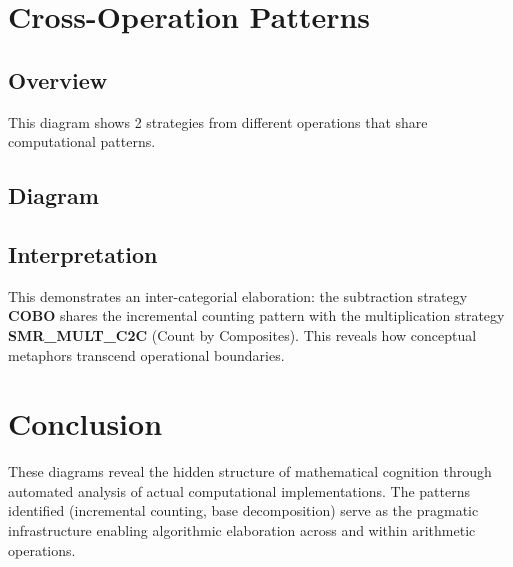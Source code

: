 \documentclass{article}
\begin{document}
\newpage

\section{Cross-Operation Patterns}

\subsection{Overview}
This diagram shows 2 strategies from different operations that share computational patterns.

\subsection{Diagram}

\begin{center}
\end{center}

\subsection{Interpretation}

This demonstrates an inter-categorial elaboration: the subtraction strategy \textbf{COBO} shares the incremental counting pattern with the multiplication strategy \textbf{SMR\_MULT\_C2C} (Count by Composites). This reveals how conceptual metaphors transcend operational boundaries.

\section{Conclusion}

These diagrams reveal the hidden structure of mathematical cognition through automated analysis of actual computational implementations. The patterns identified (incremental counting, base decomposition) serve as the pragmatic infrastructure enabling algorithmic elaboration across and within arithmetic operations.
\end{document}
